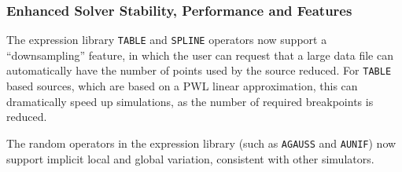 \documentclass[letterpaper]{scrartcl}
\begin{document}
\subsubsection*{Enhanced Solver Stability, Performance and Features}
\begin{XyceItemize}

\item The expression library \texttt{TABLE} and \texttt{SPLINE} operators now support a ``downsampling'' feature, in which the user can request that a large data file can automatically have the number of points used by the source reduced.  For \texttt{TABLE} based sources, which are based on a PWL linear approximation, this can dramatically speed up simulations, as the number of required breakpoints is reduced.

\item The random operators in the expression library (such as \texttt{AGAUSS} and \texttt{AUNIF}) now support implicit local and global variation, consistent with other simulators.

\end{XyceItemize}
\end{document}
